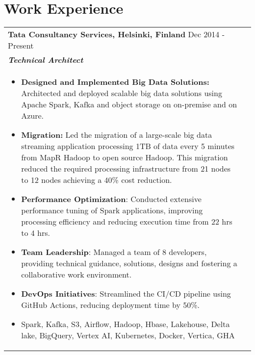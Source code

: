 \documentclass[a4paper,8pt]{article}
\begin{document}
\section{Work Experience}
\begin{tabularx}{\linewidth}{ @{}l r@{} }
\textbf{{Tata Consultancy Services, Helsinki, Finland}} \hfill \color[HTML]{371e77} Dec 2014 - Present \\[4pt]
\color[HTML]{371e77}\textbf{\textit{Technical Architect}}\ \hfill \color[HTML]{4B28A4} \\[5pt]
\begin{minipage}[t]{\linewidth}
    \begin{itemize}[nosep,after=\strut, leftmargin=2em, itemsep=2pt]
        \item \textbf{Designed and Implemented Big Data Solutions:} Architected and deployed scalable big data solutions using Apache Spark, Kafka and object storage on on-premise and on Azure.
        \item \textbf{Migration:} Led the migration of a large-scale big data streaming application processing 1TB of data every 5 minutes from MapR Hadoop to open source Hadoop. This migration reduced the required processing infrastructure from 21 nodes to 12 nodes achieving a 40\% cost reduction.
        \item \textbf{Performance Optimization}: Conducted extensive performance tuning of Spark applications, improving processing efficiency and reducing execution time from 22 hrs to 4 hrs. 
        \item \textbf{Team Leadership}: Managed a team of 8 developers, providing technical guidance, solutions, designs and fostering a collaborative work environment. 
        \item \textbf{DevOps Initiatives}: Streamlined the CI/CD pipeline using GitHub Actions, reducing deployment time by 50\%. 
        \item Spark, Kafka, S3, Airflow, Hadoop, Hbase, Lakehouse, Delta lake, BigQuery, Vertex AI, Kubernetes, Docker, Vertica, GHA
    \end{itemize}
\end{minipage}
\end{tabularx}
\end{document}
